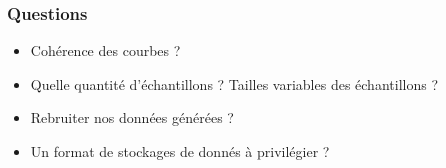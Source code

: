 \documentclass{beamer}
\begin{document}
\begin{frame}
  \frametitle{Questions}
  \begin{itemize}
    \item Cohérence des courbes ?
    \item Quelle quantité d'échantillons ? Tailles variables des échantillons ?
    \item Rebruiter nos données générées ? 
    \item Un format de stockages de donnés à privilégier ?
  \end{itemize}
\end{frame}

\end{document}
